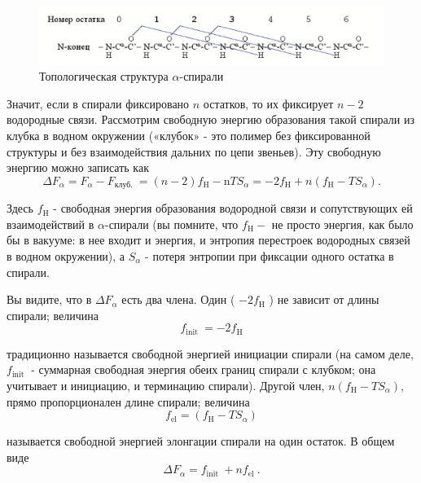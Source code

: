 \documentclass[
11pt,%
tightenlines,%
twoside,%
onecolumn,%
nofloats,%
nobibnotes,%
nofootinbib,%
superscriptaddress,%
noshowpacs,%
centertags]%
{revtex4}
\begin{document}
\begin{figure}
	\includegraphics[width=\textwidth]{ostatok}
	\caption{Топологическая структура $\alpha$-спирали}
\end{figure}

Значит, если в спирали фиксировано $n$ остатков, то их фиксирует $n-2$ водородные связи. Рассмотрим свободную энергию образования такой спирали из клубка в водном окружении («клубок» - это полимер без фиксированной структуры и без взаимодействия дальних по цепи звеньев). Эту свободную энергию можно записать как
\begin{equation}
	\Delta F_\alpha=F_\alpha-F_{\text {клуб. }}=(n-2) f_{\mathrm{H}}-\mathrm{n} T S_\alpha=-2 f_{\mathrm{H}}+n\left(f_{\mathrm{H}}-T S_\alpha\right) .
\end{equation}

Здесь $f_{\mathrm{H}}$ - свободная энергия образования водородной связи и сопутствующих ей взаимодействий в $\alpha$-спирали (вы помните, что $f_{\mathrm{H}}-$ не просто энергия, как было бы в вакууме: в нее входит и энергия, и энтропия перестроек водородных связей в водном окружении), а $S_\alpha$ - потеря энтропии при фиксации одного остатка в спирали.

Вы видите, что в $\Delta F_\alpha$ есть два члена. Один ( $-2 f_{\mathrm{H}}$ ) не зависит от длины спирали; величина
\begin{equation}
	f_{\text {init }}=-2 f_{\mathrm{H}}
\end{equation}

традиционно называется свободной энергией инициации спирали (на самом деле, $f_{\text {init }}$ - суммарная свободная энергия обеих границ спирали с клубком; она учитывает и инициацию, и терминацию спирали). Другой член, $n\left(f_{\mathrm{H}}-T S_\alpha\right)$, прямо пропорционален длине спирали; величина
\begin{equation}
	f_{\mathrm{el}}=\left(f_{\mathrm{H}}-T S_\alpha\right)
\end{equation}

называется свободной энергией элонгации спирали на один остаток. В общем виде
\begin{equation}
	\Delta F_\alpha=f_{\text {init }}+n f_{\text {el }} .
\end{equation}
\end{document}
